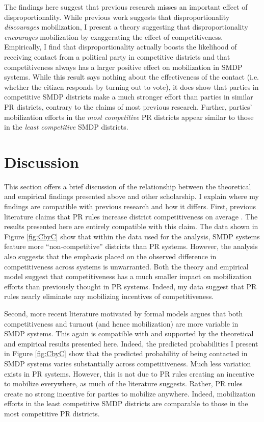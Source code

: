 \documentclass[12pt]{article}
\begin{document}
The findings here suggest that previous research misses an important effect of disproportionality. While previous work suggests that disproportionality \textit{discourages} mobilization, I present a theory suggesting that disproportionality  \textit{encourages} mobilization by exaggerating the effect of competitiveness. Empirically, I find that disproportionality actually boosts the likelihood of receiving contact from a political party in competitive districts and that competitiveness always has a larger positive effect on mobilization in SMDP systems. While this result says nothing about the effectiveness of the contact (i.e. whether the citizen responds by turning out to vote), it does show that parties in competitive SMDP districts make a much stronger effort than parties in similar PR districts, contrary to the claims of most previous research. Further, parties' mobilization efforts in the \textit{most competitive} PR districts appear similar to those in the \textit{least competitive} SMDP districts. 

\section*{Discussion}

This section offers a brief discussion of the relationship between the theoretical and empirical findings presented above and other scholarship. I explain where my findings are compatible with previous research and how it differs. First, previous literature claims that PR rules increase district competitiveness on average \citep{Powell1986, Jackman1987, BlaisDobrzynska1998, BlaisAarts2006, Blais2006}. The results presented here are entirely compatible with this claim. The data shown in Figure \ref{fig:CbyC} show that within the data used for the analysis, SMDP systems feature more ``non-competitive'' districts than PR systems. However, the analysis also suggests that the emphasis placed on the observed difference in competitiveness across systems is unwarranted. Both the theory and empirical model suggest that competitiveness has a much smaller impact on mobilization efforts than previously thought in PR systems. Indeed, my data suggest that PR rules nearly eliminate any mobilizing incentives of competitiveness. 

Second, more recent literature motivated by formal models \citep{Cox1999, Selb2009} argues that both competitiveness and turnout (and hence mobilization) are more variable in SMDP systems. This again is compatible with and supported by the theoretical and empirical results presented here. Indeed, the predicted probabilities I present in Figure \ref{fig:CbyC} show that the predicted probability of being contacted in SMDP systems varies substantially across competitiveness. Much less variation exists in PR systems. However, this is not due to PR rules creating an incentive to mobilize everywhere, as much of the literature suggests. Rather, PR rules create no strong incentive for parties to mobilize anywhere. Indeed, mobilization efforts in the least competitive SMDP districts are comparable to those in the most competitive PR districts.
\end{document}
